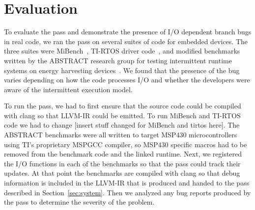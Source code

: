 \section{Evaluation}
%
%
To evaluate the pass and demonstrate the presence of I/O dependent branch
bugs in real code, we ran the pass on several suites of code for embedded
devices. The three suites were MiBench~\cite{mibench}, TI-RTOS driver
code~\cite{tirtos}, and modified benchmarks written by the ABSTRACT research
group for testing intermittent runtime systems on energy harvesting
devices~\cite{alpaca,chain,dino,capybara}.  We found that the presence of the
bug varies depending on how the code processes I/O and whether the developers
were aware of the intermittent execution model.

To run the pass, we had to first ensure that the source code could be compiled
with clang so that LLVM-IR could be emitted. To run MiBench and TI-RTOS code we
had to change [insert stuff changed for MiBench and tirtos here]. The ABSTRACT
benchmarks were all written to target MSP430 microcontrollers using TI's
proprietary MSPGCC compiler, so MSP430 specific macros had to be removed from
the benchmark code and the linked runtime.
%
Next, we registered the I/O functions in each of the benchmarks so that the pass
could track their updates. At that point the benchmarks are compiled with
clang so that debug information is included in the LLVM-IR that is produced and
handed to the pass described in Section~\ref{sec:system}. Then we analyzed any
bug reports produced by the pass to determine the severity of the problem.

